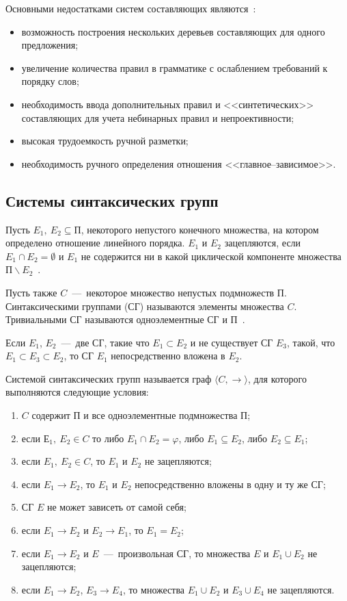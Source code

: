 Основными недостатками систем составляющих являются~\cite{jurafsky2026speech,Testelets2001,bolshakova2017avtomaticheskaya,Poletaev2023ConstituencyTree}:
\begin{itemize}
	\item возможность построения нескольких деревьев составляющих для одного предложения;
	\item увеличение количества правил в грамматике с ослаблением требований к порядку слов;
	\item необходимость ввода дополнительных правил и <<синтетических>> составляющих для учета небинарных правил и непроективности;
	\item высокая трудоемкость ручной разметки;
	\item необходимость ручного определения отношения <<главное--зависимое>>.
\end{itemize}

\subsection{Системы синтаксических групп}

Пусть $E_1,\ E_2 \subseteq \textit{П}$, некоторого непустого конечного множества, на котором определено отношение линейного порядка. $E_1$ и $E_2$ зацепляются, если $E_1 \cap E_2 = \emptyset$ и $E_1$ не содержится ни в какой циклической компоненте множества $\textit{П}\backslash E_2$~\cite{gladkij1985sintaksicheskie}.

Пусть также $C$~---~некоторое множество непустых подмножеств $\textit{П}$. Синтаксическими группами (СГ) называются элементы множества $C$. Тривиальными СГ называются одноэлементные СГ и $\textit{П}$~\cite{gladkij1985sintaksicheskie}.

Если $E_1$, $E_2$~---~две СГ, такие что $E_1 \subset E_2$ и не существует СГ $E_3$, такой, что $E_1 \subset E_3 \subset E_2$, то СГ $E_1$ непосредственно вложена в $E_2$.

Системой синтаксических групп называется граф $\langle C,\rightarrow\rangle$, для которого выполняются следующие условия:
\begin{enumerate}
	\item $C$ содержит $\textit{П}$ и все одноэлементные подмножества $\textit{П}$;
	\item если $Е_1,\ E_2 \in C$ то либо $E_1 \cap E_2 = \varphi$, либо $E_1 \subseteq E_2$, либо $E_2 \subseteq E_1$;
	\item если $E_1,\ E_2 \in C$, то $E_1$ и $E_2$ не зацепляются;
	\item если $E_1 \rightarrow E_2$, то $E_1$ и $E_2$ непосредственно вложены в одну и ту же СГ;
	\item СГ $E$ не может зависеть от самой себя;
	\item если $E_1\rightarrow E_2$ и $E_2 \rightarrow E_1$, то $E_1 = E_2$;
	\item если $E_1 \rightarrow E_2$ и $E$~---~произвольная СГ, то множества $E$ и $E_1 \cup E_2$ не зацепляются;
	\item если $E_1 \rightarrow E_2$, $E_3 \rightarrow E_4$, то множества $E_1 \cup E_2$ и $E_3 \cup E_4$ не зацепляются.
\end{enumerate}

